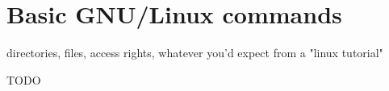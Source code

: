 \chapter{Basic GNU/Linux commands}

\begin{chapsummary}
directories, files, access rights, whatever you'd expect from a "linux tutorial"
\end{chapsummary}

TODO
